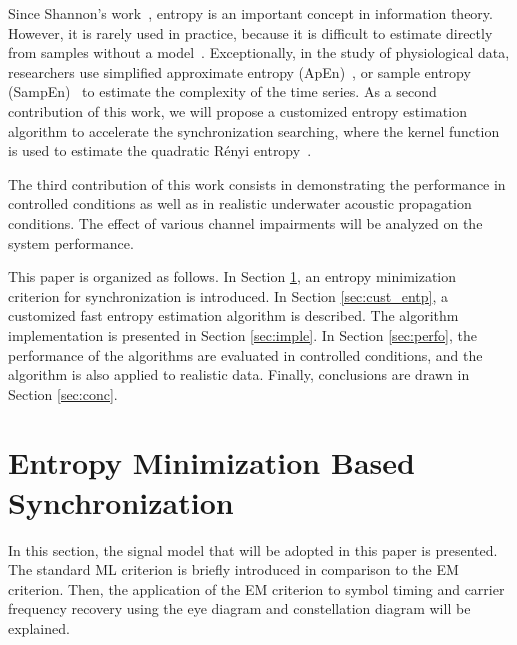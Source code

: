 \documentclass[journal,comsoc, onecolumn, 12pt,draftclsnofoot]{IEEEtran} %
\begin{document}
Since Shannon's work~\cite{Shannon1948}, entropy is an important concept in information theory. 
However, it is rarely used in practice, because it is difficult to estimate directly from samples without a model~\cite{Bercher2000,Santamaria2002}.
Exceptionally, in the study of physiological data, researchers use simplified approximate entropy (ApEn)~\cite{Pincus1991}, or sample entropy (SampEn)~\cite{Richman2000} to estimate the complexity of the time series.
As a second contribution of this work, we will propose a customized entropy estimation algorithm to accelerate the synchronization searching,
where the kernel function is used to estimate the quadratic R\'enyi entropy~\cite{Santamaria2002,Huang2008}.

The third contribution of this work consists in demonstrating the performance in controlled conditions as well as in realistic underwater acoustic propagation conditions.  
The effect of various channel impairments will be analyzed on the system performance.  



This paper is organized as follows.
In Section \ref{sec:entropy},
an entropy minimization criterion for synchronization is introduced. 
In Section \ref{sec:cust_entp}, a customized fast entropy estimation algorithm is described. 
The algorithm implementation is presented in Section \ref{sec:imple}.
In Section \ref{sec:perfo}, the performance of the algorithms are evaluated in controlled conditions, and the algorithm is also applied to realistic data.  
Finally, conclusions are drawn in Section \ref{sec:conc}.

\section{Entropy Minimization Based Synchronization}
\label{sec:entropy}
In this section, the signal model that will be adopted in this paper is presented.
The standard ML criterion is briefly introduced in comparison to the EM criterion.
Then, the application of the EM criterion to symbol timing and carrier frequency recovery using the eye diagram and constellation diagram will be explained.
\end{document}
